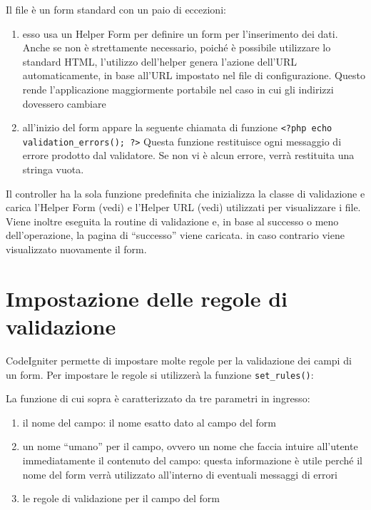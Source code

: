 Il file  è un form standard con un paio di eccezioni:

\begin{enumerate}
\item esso usa un Helper Form per definire un form per l'inserimento dei dati. Anche se non è strettamente necessario, poiché è possibile utilizzare lo standard \ac{HTML}, l'utilizzo dell'helper genera l'azione dell'\ac{URL} automaticamente, in base all'\ac{URL} impostato nel file di configurazione. Questo rende l'applicazione maggiormente portabile nel caso in cui gli indirizzi dovessero cambiare
\item all'inizio del form appare la seguente chiamata di funzione \verb|<?php echo validation_errors(); ?>| Questa funzione restituisce ogni messaggio di errore prodotto dal validatore. Se non vi è alcun errore, verrà restituita una stringa vuota.
\end{enumerate}

Il controller  ha la sola funzione predefinita  che inizializza la classe di validazione e carica l'Helper Form (vedi) e l'Helper URL (vedi) utilizzati per visualizzare i file. Viene inoltre eseguita la routine di validazione e, in base al successo o meno dell'operazione, la pagina di ``successo'' viene caricata. in caso contrario viene visualizzato nuovamente il form.

\section*{Impostazione delle regole di validazione}
CodeIgniter permette di impostare molte regole per la validazione dei campi di un form. Per impostare le regole si utilizzerà la funzione \verb|set_rules()|:


La funzione di cui sopra è caratterizzato da tre parametri in ingresso:

\begin{enumerate}
\item il nome del campo: il nome esatto dato al campo del form
\item un nome ``umano'' per il campo, ovvero un nome che faccia intuire all'utente immediatamente il contenuto del campo: questa informazione è utile perché il nome del form verrà utilizzato all'interno di eventuali messaggi di errori 
\item le regole di validazione per il campo del form
\end{enumerate}

